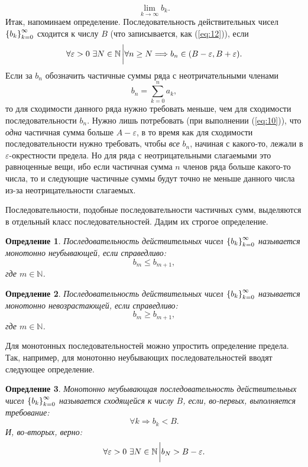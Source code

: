 \documentclass[12pt]{article}
\newtheorem{definition}{Опредление}[section]
\begin{document}
\begin{equation}\label{eq:12}
    \lim_{k\rightarrow\infty}{b_k}.
\end{equation}
Итак, напоминаем определение. Последовательность действительных чисел $\qty{b_k}_{k=0}^\infty$ сходится к числу $B$ (что записывается, как (\ref{eq:12})), если
\begin{equation}
\forall \varepsilon > 0\ \exists N \in \mathbb{N} \eval \forall n \ge N \Longrightarrow b_n \in \qty(B - \varepsilon, B + \varepsilon).
\end{equation}
Если за $b_n$ обозначить частичные суммы ряда с неотричательными членами
\begin{equation}
    b_n = \sum_{k=0}^n a_k,
\end{equation}
то для сходимости данного ряда нужно требовать меньше, чем для сходимости последовательности $b_n$. Нужно лишь потребовать (при выполнении (\ref{eq:10})), что \emph{одна} частичная сумма больше $A-\varepsilon$, в то время как для сходимости последовательности нужно требовать, чтобы \emph{все} $b_n$, начиная с какого\--то, лежали в $\varepsilon$\--окрестности предела. Но для ряда с неотрицательными слагаемыми это равноценные вещи, ибо если частичная сумма $n$ членов ряда больше какого\--то числа, то и следующие частичные суммы будут точно не меньше данного числа из\--за неотрицательности слагаемых.
\par
Последовательности, подобные последовательности частичных сумм, выделяются в отдельный класс последовательностей. Дадим их строгое определение.
\begin{definition}
Последовательность действительных чисел $\qty{b_k}_{k=0}^\infty$ называется монотонно неубывающей, если справедливо:
\begin{equation}
    b_m \le b_{m+1},
\end{equation}
где $m \in \mathbb{N}$.
\end{definition}
\begin{definition}
Последовательность действительных чисел $\qty{b_k}_{k=0}^\infty$ называется монотонно невозрастающей, если справедливо:
\begin{equation}
    b_m \ge b_{m+1},
\end{equation}
где $m \in \mathbb{N}$.
\end{definition}
Для монотонных последовательностей можно упростить определение предела. Так, например, для монотонно неубывающих последовательностей вводят следующее определение.
\begin{definition}
Монотонно неубывающая последовательность действительных чисел $\qty{b_k}_{k=0}^\infty$ называется сходящейся к числу $B$, если, во\--первых, выполняется требование:
\begin{equation}
    \forall k \Longrightarrow b_k < B.
\end{equation}
И, во\--вторых, верно:
\begin{equation}
    \forall \varepsilon > 0\ \exists N \in \mathbb{N}\eval b_N > B-\varepsilon.
\end{equation}
\end{definition}
\end{document}
